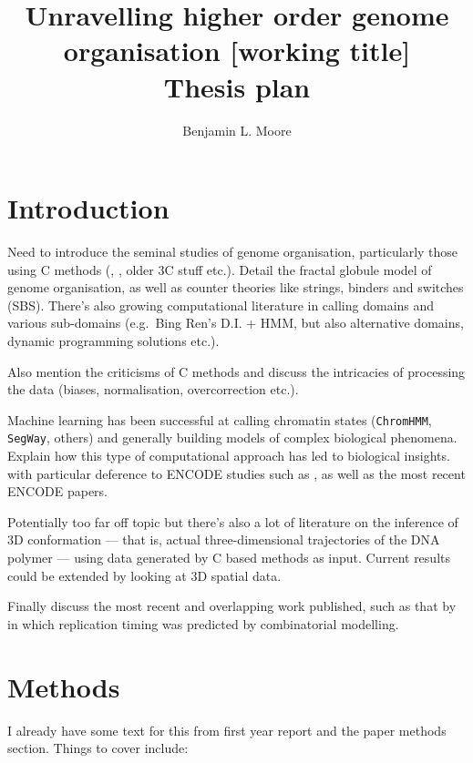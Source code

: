 \documentclass[a4paper,10pt,oneside]{book}
\title{ \vspace{3in} Unravelling higher order genome organisation {\small [working
    title]} \\ \vspace{2em} {\large {\bf Thesis plan}} }
\author{Benjamin L. Moore}
\begin{document}
\maketitle

\chapter{Introduction}

Need to introduce the seminal studies of genome organisation,
particularly those using C methods (\citet{Lieberman2011},
\citet{Dixon2012}, older 3C stuff\citep{VanSteensel2010} etc.). Detail
the fractal globule\citep{Lieberman2011} model of genome organisation,
as well as counter theories like strings, binders and switches
(SBS)\citep{Barbieri2012}. There's also growing computational literature
in calling domains and various sub-domains (e.g.~Bing Ren's D.I. +
HMM\citep{Dixon2012}, but also alternative domains\citep{Filippova2014},
dynamic programming solutions\citep{Levy-Leduc2014} etc.).

Also mention the criticisms of C
methods\cite{Gavrilov2013, Gavrilov2013a} and discuss the intricacies of
processing the data (biases,\citep{Yaffe2011}
normalisation\citep{Imakaev2012, Hu2012, Hu2013},
overcorrection\citep{Jin2013} etc.).

Machine learning has been successful at calling chromatin states
(\texttt{ChromHMM}, \texttt{SegWay}, others) and generally building
models of complex biological phenomena. Explain how this type of
computational approach has led to biological insights. with particular
deference to ENCODE studies such as \citet{Dong2012}, as well as the
most recent ENCODE papers.

Potentially too far off topic but there's also a lot of literature on
the inference of 3D
conformation\cite{Varoquaux2014a, Ay2014b, Dekker2013, Bau2011a, Hu2013a}
--- that is, actual three-dimensional trajectories of the DNA polymer
--- using data generated by C based methods as input. Current results
could be extended by looking at 3D spatial data.

Finally discuss the most recent and overlapping work published, such as
that by \citet{Comoglio2014} in which replication timing was predicted
by combinatorial modelling.

\chapter{Methods}

I already have some text for this from first year report and the paper
methods section. Things to cover include:
\end{document}
